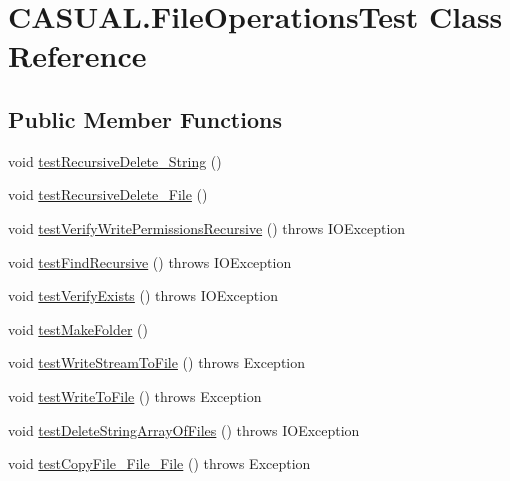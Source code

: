 \hypertarget{class_c_a_s_u_a_l_1_1_file_operations_test}{\section{C\-A\-S\-U\-A\-L.\-File\-Operations\-Test Class Reference}
\label{class_c_a_s_u_a_l_1_1_file_operations_test}
}
\subsection*{Public Member Functions}
\begin{DoxyCompactItemize}
\item 
void \hyperlink{class_c_a_s_u_a_l_1_1_file_operations_test_a199ede33b2f73e1ab1e1b70f0007deac}{test\-Recursive\-Delete\-\_\-\-String} ()
\item 
void \hyperlink{class_c_a_s_u_a_l_1_1_file_operations_test_abdcd987901d93504d75df2f5451716f2}{test\-Recursive\-Delete\-\_\-\-File} ()
\item 
void \hyperlink{class_c_a_s_u_a_l_1_1_file_operations_test_abe7a7ea3384a6c592265d8f5e912de9c}{test\-Verify\-Write\-Permissions\-Recursive} ()  throws I\-O\-Exception 
\item 
void \hyperlink{class_c_a_s_u_a_l_1_1_file_operations_test_af9232c145c57fe7ebfabbeb9848684d8}{test\-Find\-Recursive} ()  throws I\-O\-Exception 
\item 
void \hyperlink{class_c_a_s_u_a_l_1_1_file_operations_test_a1fe7d7eb1f0279b8a1951498a949393b}{test\-Verify\-Exists} ()  throws I\-O\-Exception 
\item 
void \hyperlink{class_c_a_s_u_a_l_1_1_file_operations_test_a6eff05750f82920d4c71770a920dcfc4}{test\-Make\-Folder} ()
\item 
void \hyperlink{class_c_a_s_u_a_l_1_1_file_operations_test_af98e032770596afee74a4581f4d9d5a6}{test\-Write\-Stream\-To\-File} ()  throws Exception 
\item 
void \hyperlink{class_c_a_s_u_a_l_1_1_file_operations_test_a083645a1e316e49e571fd2db0f47c6db}{test\-Write\-To\-File} ()  throws Exception 
\item 
void \hyperlink{class_c_a_s_u_a_l_1_1_file_operations_test_ac3c8eb6dbb6177a2904d66fa8d5423ef}{test\-Delete\-String\-Array\-Of\-Files} ()  throws I\-O\-Exception 
\item 
void \hyperlink{class_c_a_s_u_a_l_1_1_file_operations_test_aba706f9362618ceb037ef6a9774633b0}{test\-Copy\-File\-\_\-\-File\-\_\-\-File} ()  throws Exception 

\end{DoxyCompactItemize}

